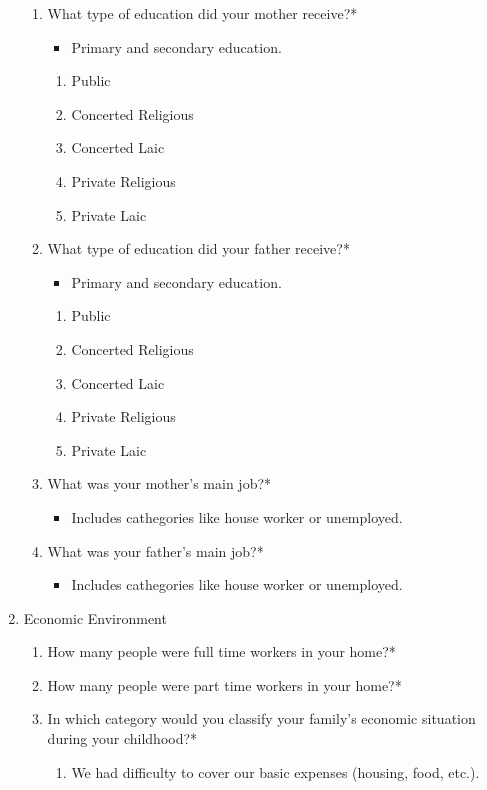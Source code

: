\documentclass[12pt]{article}
\begin{document}
\begin{enumerate}
\begin{enumerate}
\item What type of education did your mother receive?*
\begin{itemize}
\item Primary and secondary education.
\end{itemize}
\begin{enumerate}
\item Public
\item Concerted Religious
\item Concerted Laic
\item Private Religious
\item Private Laic
\end{enumerate}
\item What type of education did your father receive?*
\begin{itemize}
\item Primary and secondary education.
\end{itemize}
\begin{enumerate}
\item Public
\item Concerted Religious
\item Concerted Laic
\item Private Religious
\item Private Laic
\end{enumerate}
\item What was your mother's main job?*
\begin{itemize}
\item Includes cathegories like house worker or unemployed.
\end{itemize}
\item What was your father's main job?*
\begin{itemize}
\item Includes cathegories like house worker or unemployed.
\end{itemize}
\end{enumerate}
\item Economic Environment
\begin{enumerate}
\item How many people were full time workers in your home?*
\item How many people were part time workers in your home?*
\item In which category would you classify your family's economic situation during your childhood?*
\begin{enumerate}
\item We had difficulty to cover our basic expenses (housing, food, etc.).

\end{enumerate}
\end{enumerate}
\end{enumerate}
\end{document}
